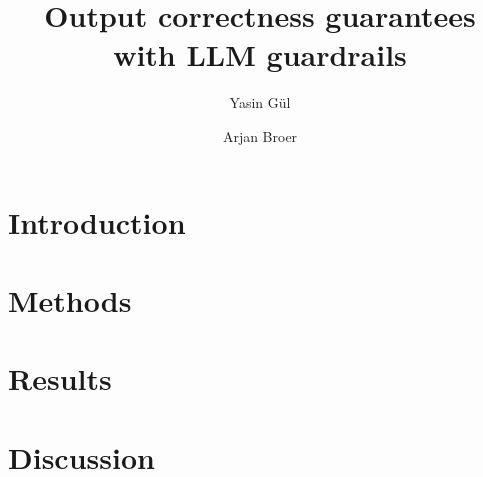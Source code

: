 \documentclass[a4paper,doc,natbib]{apa6}
\title{Output correctness guarantees with LLM guardrails}
\author{Yasin G\"{u}l \and Arjan Broer}
\affiliation{Open University of the Netherlands}
\begin{document}
    \maketitle

\section{Introduction}
    
    
\section{Methods}
    

\section{Results}
    

\section{Discussion}
    


\end{document}

